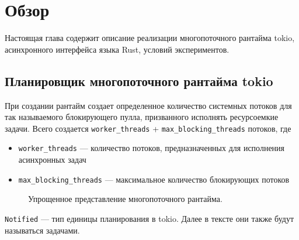 
\section{Обзор}

Настоящая глава содержит описание реализации многопоточного рантайма tokio, асинхронного интерфейса языка Rust, условий экспериментов.

\subsection{Планировщик многопоточного рантайма tokio}

При создании рантайм создает определенное количество системных потоков для так называемого блокирующего пулла, призванного исполнять ресурсоемкие задачи. Всего создается \verb|worker_threads| + \verb|max_blocking_threads| потоков, где

\begin{itemize}
    \item \verb|worker_threads| --- количество потоков, предназначенных для исполнения асинхронных задач
    \item \verb|max_blocking_threads| --- максимальное количество блокирующих потоков
\end{itemize}

\begin{figure}[H]
    \begin{center}
    \end{center}

    \caption{Упрощенное представление многопоточного рантайма.}
    \label{fig:tokio:arch}
\end{figure}

\verb|Notified| --- тип единицы планирования в tokio. Далее в тексте они также будут называться задачами.

